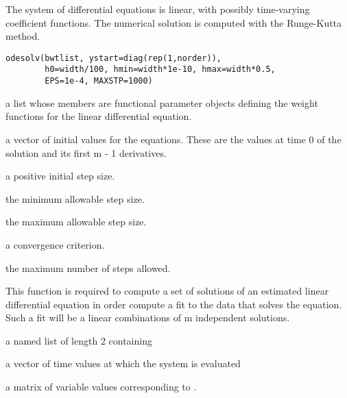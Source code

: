 \documentclass{article}
\begin{document}
\begin{Description}\relax
The system of differential equations is linear, with
possibly time-varying coefficient functions.
The numerical solution is computed with the Runge-Kutta method.
\end{Description}
\begin{Usage}
\begin{verbatim}
odesolv(bwtlist, ystart=diag(rep(1,norder)),
        h0=width/100, hmin=width*1e-10, hmax=width*0.5,
        EPS=1e-4, MAXSTP=1000)
\end{verbatim}
\end{Usage}
\begin{Arguments}
\begin{ldescription}
\item[\code{bwtlist}] a list whose members are functional parameter objects
defining the weight functions for the linear differential
equation.

\item[\code{ystart}] a vector of initial values for the equations.  These
are the values at time 0 of the solution and its first
m - 1 derivatives.

\item[\code{h0}] a positive initial step size.

\item[\code{hmin}] the minimum allowable step size.

\item[\code{hmax}] the maximum allowable step size.

\item[\code{EPS}] a convergence criterion.

\item[\code{MAXSTP}] the maximum number of steps allowed.

\end{ldescription}
\end{Arguments}
\begin{Details}\relax
This function is required to compute a set of solutions of an
estimated linear differential equation in order compute a fit
to the data that solves the equation.  Such a fit will be a
linear combinations of m independent solutions.
\end{Details}
\begin{Value}
a named list of length 2 containing

\begin{ldescription}
\item[\code{tp}] a vector of time values at which the system is evaluated

\item[\code{yp}] a matrix of variable values corresponding to .

\end{ldescription}
\end{Value}
\end{document}

